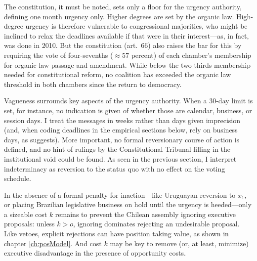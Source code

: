 \documentclass[letter,12pt]{article}
\begin{document}
The constitution, it must be noted, sets only a floor for the urgency authority, defining one month urgency only. Higher degrees are set by the organic law. High-degree urgency is therefore vulnerable to congressional majorities, who might be inclined to relax the deadlines available if that were in their interest---as, in fact, was done in 2010. But the constitution (art.~66) also raises the bar for this by requiring the vote of four-sevenths ($\approx 57$ percent) of each chamber's membership for organic law passage and amendment. While below the two-thirds membership needed for constitutional reform, no coalition has exceeded the organic law threshold in both chambers since the return to democracy.

Vagueness surrounds key aspects of the urgency authority. When a 30-day limit is set, for instance, no indication is given of whether those are calendar, business, or session days. I treat the messages in weeks rather than days given imprecision (and, when coding deadlines in the empirical sections below, rely on business days, as \citet[][:285]{sotoCongChile2015} suggests). More important, no formal reversionary course of action is defined, and no hint of rulings by the Constitutional Tribunal filling in the institutional void could be found. As seen in the previous section, I interpret indeterminacy as reversion to the status quo with no effect on the voting schedule.

In the absence of a formal penalty for inaction---like Uruguayan reversion to $x_1$, or placing Brazilian legislative business on hold until the urgency is heeded---only a sizeable cost $k$ remains to prevent the Chilean assembly ignoring executive proposals: unless $k>o$, ignoring dominates rejecting an undesirable proposal. Like vetoes, explicit rejections can have position taking value, as shown in chapter \ref{ch:posModel}. And cost $k$ may be key to remove (or, at least, minimize) executive disadvantage in the presence of opportunity costs. 
\end{document}
